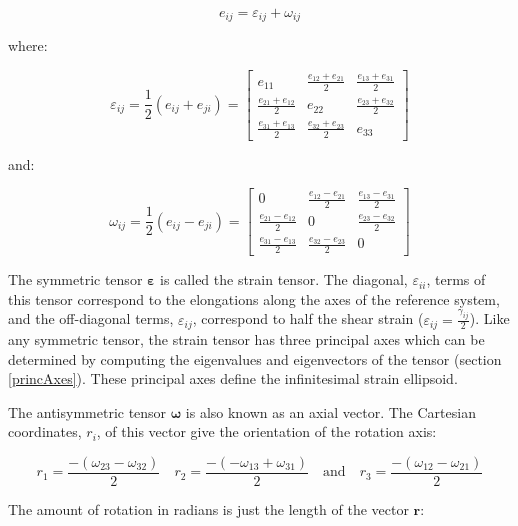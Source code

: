 \documentclass[a4paper , 12pt]{book}
\begin{document}
\begin{equation}
    e_{ij} = \varepsilon_{ij} + \omega_{ij}
\end{equation}

where:

\begin{equation}\label{eq8.14}
    \varepsilon_{ij}=\frac{1}{2}(e_{ij}+e_{ji})=\begin{bmatrix}e_{11}&\frac{e_{12}+e_{21}}{2}&\frac{e_{13}+e_{31}}{2}\\ \frac{e_{21}+e_{12}}{2}&e_{22}&\frac{e_{23}+e_{32}}{2}\\ \frac{e_{31}+e_{13}}{2}&\frac{e_{32}+e_{23}}{2}&e_{33}\end{bmatrix}
\end{equation}

and:

\begin{equation}
    \omega_{ij}=\frac{1}{2}(e_{ij}-e_{ji})=\begin{bmatrix}0&\frac{e_{12}-e_{21}}{2}&\frac{e_{13}-e_{31}}{2}\\ \frac{e_{21}-e_{12}}{2}&0&\frac{e_{23}-e_{32}}{2}\\ \frac{e_{31}-e_{13}}{2}&\frac{e_{32}-e_{23}}{2}&0\end{bmatrix}
\end{equation}

The symmetric tensor $\boldsymbol{\varepsilon}$ is called the strain tensor. The diagonal, $\varepsilon_{ii}$, terms of this tensor correspond to the elongations along the axes of the reference system, and the off-diagonal terms, $\varepsilon_{ij}$, correspond to half the shear strain ($\varepsilon_{ij} = \frac{\gamma_{ij}}{2}$). Like any symmetric tensor, the strain tensor has three principal axes which can be determined by computing the eigenvalues and eigenvectors of the tensor (section \ref{princAxes}). These principal axes define the infinitesimal strain ellipsoid.  


The antisymmetric tensor $\boldsymbol{\omega}$ is also known as an axial vector. The Cartesian coordinates, $r_i$, of this vector give the orientation of the rotation axis:

\begin{equation}
    r_1=\frac{-(\omega_{23}-\omega_{32})}{2}\quad r_2=\frac{-(-\omega_{13}+\omega_{31})}{2}\quad \text{and}\quad r_3=\frac{-(\omega_{12}-\omega_{21})}{2}
\end{equation}

The amount of rotation in radians is just the length of the vector $\mathbf{r}$:
\end{document}
